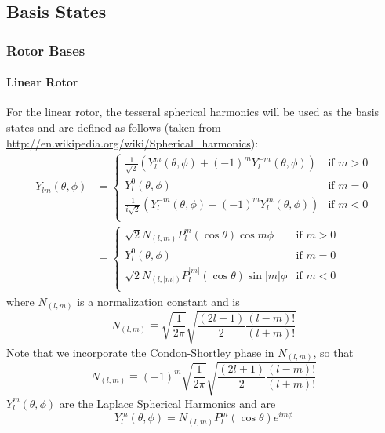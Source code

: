 \documentclass{revtex4-1}
\begin{document}
\subsection{Basis States}\label{S:BS}
\subsubsection{Rotor Bases}\label{S:RotBS}
\paragraph{Linear Rotor}\label{S:LinRotBS}
For the linear rotor, the tesseral spherical harmonics will be used as the basis states and are defined as follows (taken from \url{http://en.wikipedia.org/wiki/Spherical_harmonics}):
\begin{align}
Y_{lm}(\theta,\phi)&=\begin{cases}\label{E:SphDefComb} 	\frac{1}{\sqrt{2}}\left(Y^{m}_{l}\left(\theta,\phi\right)+\left(-1\right)^{m}Y^{-m}_{l}\left(\theta,\phi\right)\right) &\mbox{if } m>0\\
								 	Y^{0}_{l}\left(\theta,\phi\right) &\mbox{if } m=0\\
								 	\frac{1}{i\sqrt{2}}\left(Y^{-m}_{l}\left(\theta,\phi\right)-\left(-1\right)^{m}Y^{m}_{l}\left(\theta,\phi\right)\right) &\mbox{if } m<0\\
								 	\end{cases}\\
				   &=\begin{cases}\label{E:SphDefTes} 	\sqrt{2}N_{\left(l,m\right)}P^{m}_{l}\left(\cos{\theta}\right)\cos{m\phi} &\mbox{if } m>0\\
				   					Y^{0}_{l}\left(\theta,\phi\right) &\mbox{if } m=0\\
									\sqrt{2}N_{\left(l,|m|\right)}P^{|m|}_{l}\left(\cos{\theta}\right)\sin{|m|\phi} &\mbox{if } m<0\\
				   					\end{cases}
\end{align}
where $N_{\left(l,m\right)}$ is a normalization constant and is 
\begin{equation}
N_{\left(l,m\right)}\equiv\sqrt{\frac{1}{2\pi}}\sqrt{\frac{\left(2l+1\right)}{2}\frac{\left(l-m\right)!}{\left(l+m\right)!}}
\end{equation}
Note that we incorporate the Condon-Shortley phase in $N_{\left(l,m\right)}$, so that 
\begin{equation}
N_{\left(l,m\right)}\equiv\left(-1\right)^{m}\sqrt{\frac{1}{2\pi}}\sqrt{\frac{\left(2l+1\right)}{2}\frac{\left(l-m\right)!}{\left(l+m\right)!}}
\end{equation}
$Y^{m}_{l}\left(\theta,\phi\right)$ are the Laplace Spherical Harmonics and are  
\begin{equation}
Y^{m}_{l}\left(\theta,\phi\right)=N_{\left(l,m\right)}P^{m}_{l}\left(\cos{\theta}\right)e^{im\phi}
\end{equation}
\end{document}

